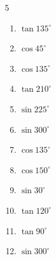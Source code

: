 \begin{multicols}{5}
\begin{enumerate}
  \item $\displaystyle \tan{135^\circ}$

        \phantom{$\displaystyle =-1$}

  \item $\displaystyle \cos{45^\circ}$


  \item $\displaystyle \cos{135^\circ}$


  \item $\displaystyle \tan{210^\circ}$


  \item $\displaystyle \sin{225^\circ}$


  \item $\displaystyle \sin{300^\circ}$


  \item $\displaystyle \cos{135^\circ}$


  \item $\displaystyle \cos{150^\circ}$


  \item $\displaystyle \sin{30^\circ}$


  \item $\displaystyle \tan{120^\circ}$


  \item $\displaystyle \tan{90^\circ}$

        \phantom{$\displaystyle なし$}

  \item $\displaystyle \sin{300^\circ}$


\columnbreak %


\end{enumerate}
\end{multicols}
